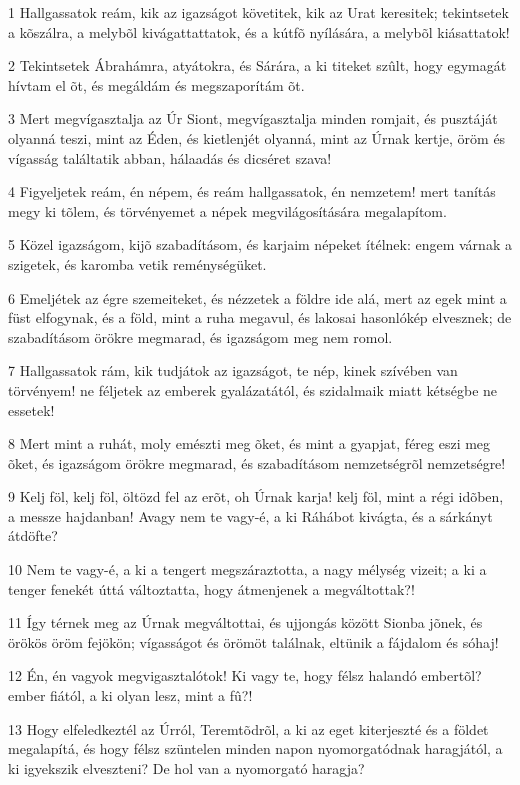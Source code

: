 \par 1 Hallgassatok reám, kik az igazságot követitek, kik az Urat keresitek; tekintsetek a kõszálra, a melybõl kivágattattatok, és a kútfõ nyílására, a melybõl kiásattatok!
\par 2 Tekintsetek Ábrahámra, atyátokra, és Sárára, a ki titeket szûlt, hogy egymagát hívtam el õt, és megáldám és megszaporítám õt.
\par 3 Mert megvígasztalja az Úr Siont, megvígasztalja minden romjait, és pusztáját olyanná teszi, mint az Éden, és kietlenjét olyanná, mint az Úrnak kertje, öröm és vígasság találtatik abban, hálaadás és dicséret szava!
\par 4 Figyeljetek reám, én népem, és reám hallgassatok, én nemzetem! mert tanítás megy ki tõlem, és törvényemet a népek megvilágosítására megalapítom.
\par 5 Közel igazságom, kijõ szabadításom, és karjaim népeket ítélnek: engem várnak a szigetek, és karomba vetik reménységüket.
\par 6 Emeljétek az égre szemeiteket, és nézzetek a földre ide alá, mert az egek mint a füst elfogynak, és a föld, mint a ruha megavul, és lakosai hasonlókép elvesznek; de szabadításom örökre megmarad, és igazságom meg nem romol.
\par 7 Hallgassatok rám, kik tudjátok az igazságot, te nép, kinek szívében van törvényem! ne féljetek az emberek gyalázatától, és szidalmaik miatt kétségbe ne essetek!
\par 8 Mert mint a ruhát, moly emészti meg õket, és mint a gyapjat, féreg eszi meg õket, és igazságom örökre megmarad, és szabadításom nemzetségrõl nemzetségre!
\par 9 Kelj föl, kelj föl, öltözd fel az erõt, oh Úrnak karja! kelj föl, mint a régi idõben, a messze hajdanban! Avagy nem te vagy-é, a ki Ráhábot kivágta, és a sárkányt átdöfte?
\par 10 Nem te vagy-é, a ki a tengert megszáraztotta, a nagy mélység vizeit; a ki a tenger fenekét úttá változtatta, hogy átmenjenek a megváltottak?!
\par 11 Így térnek meg az Úrnak megváltottai, és ujjongás között Sionba jõnek, és örökös öröm fejökön; vígasságot és örömöt találnak, eltünik a fájdalom és sóhaj!
\par 12 Én, én vagyok megvigasztalótok! Ki vagy te, hogy félsz halandó embertõl? ember fiától, a ki olyan lesz, mint a fû?!
\par 13 Hogy elfeledkeztél az Úrról, Teremtõdrõl, a ki az eget kiterjeszté és a földet megalapítá, és hogy félsz szüntelen minden napon nyomorgatódnak haragjától, a ki igyekszik elveszteni? De hol van a nyomorgató haragja?
